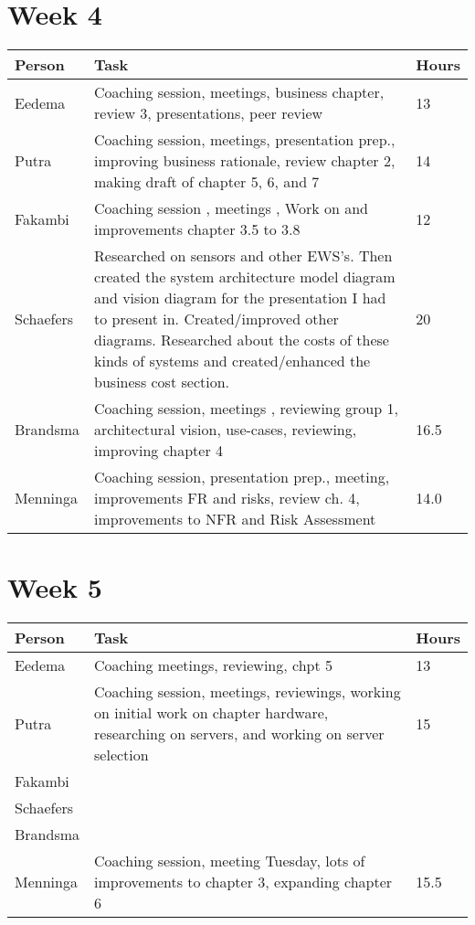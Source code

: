 \section{Week 4}
\begin{tabular}{p{} p{} p{}}
   \textbf{Person} & \textbf{Task} & \textbf{Hours} \\ \midrule
	Eedema & Coaching session, meetings, business chapter, review 3, presentations, peer review &13  \\ \midrule
	Putra & Coaching session, meetings, presentation prep., improving business rationale, review chapter 2, making draft of chapter 5, 6, and 7 & 14 \\ \midrule
	Fakambi & Coaching session , meetings , Work on and improvements chapter 3.5 to 3.8 & 12 \\ \midrule
	Schaefers & Researched on sensors and other EWS's. Then created the system architecture model diagram and vision diagram for the presentation I had to present in. Created/improved other diagrams. Researched about the costs of these kinds of systems and created/enhanced the business cost section. & 20 \\ \midrule
	Brandsma & Coaching session, meetings , reviewing group 1, architectural vision, use-cases, reviewing, improving chapter 4 & 16.5\\ \midrule
	Menninga & Coaching session, presentation prep., meeting, improvements FR and risks, review ch. 4, improvements to NFR and Risk Assessment & 14.0 \\ \midrule
\end{tabular}

\section{Week 5}
\begin{tabular}{p{} p{} p{}}
    \textbf{Person} & \textbf{Task} & \textbf{Hours} \\ \midrule
	Eedema & Coaching meetings, reviewing, chpt 5  & 13 \\ \midrule
	Putra & Coaching session, meetings, reviewings, working on initial work on chapter hardware, researching on servers, and working on server selection  & 15 \\ \midrule
	Fakambi & & \\ \midrule
	Schaefers &  & \\ \midrule
	Brandsma &  & \\ \midrule
	Menninga & Coaching session, meeting Tuesday, lots of improvements to chapter 3, expanding chapter 6 & 15.5 \\ \midrule
\end{tabular}

